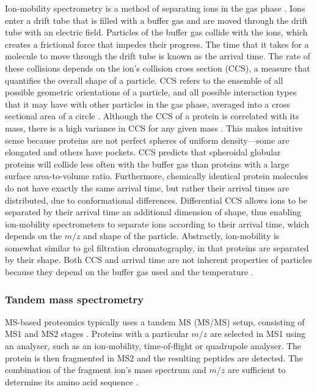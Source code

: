 Ion-mobility spectrometry is a method of separating ions in the gas phase \cite{Gabelica2018}.
Ions enter a drift tube that is filled with a buffer gas and are moved through the drift tube with an electric field.
Particles of the buffer gas collide with the ions, which creates a frictional force that impedes their progress.
The time that it takes for a molecule to move through the drift tube is known as the arrival time.
The rate of these collisions depends on the ion's collision cross section (CCS), a measure that quantifies the overall shape of a particle.
CCS refers to the ensemble of all possible geometric orientations of a particle, and all possible interaction types that it may have with other particles in the gas phase, averaged into a cross sectional area of a circle \cite{May2017}.
Although the CCS of a protein is correlated with its mass, there is a high variance in CCS for any given mass \cite{May2017}.
This makes intuitive sense because proteins are not perfect spheres of uniform density---some are elongated and others have pockets.
CCS predicts that spheroidal globular proteins will collide less often with the buffer gas than proteins with a large surface area-to-volume ratio.
Furthermore, chemically identical protein molecules do not have exactly the same arrival time, but rather their arrival times are distributed, due to conformational differences.
Differential CCS allows ions to be separated by their arrival time an additional dimension of shape, thus enabling ion-mobility spectrometers to separate ions according to their arrival time, which depends on the $m/z$ and shape of the particle.
Abstractly, ion-mobility is somewhat similar to gel filtration chromatography, in that proteins are separated by their shape.
Both CCS and arrival time are not inherent properties of particles because they depend on the buffer gas used and the temperature \cite{Gabelica2018}.

\subsubsection{Tandem mass spectrometry}

MS-based proteomics typically uses a tandem MS (MS/MS) setup, consisting of MS1 and MS2 stages \cite{Schubert2017}.
Proteins with a particular $m/z$ are selected in MS1 using an analyser, such as an ion-mobility, time-of-flight or quadrupole analyser.
The protein is then fragmented in MS2 and the resulting peptides are detected.
The combination of the fragment ion's mass spectrum and $m/z$ are sufficient to determine its amino acid sequence \cite{Noor2019}.

